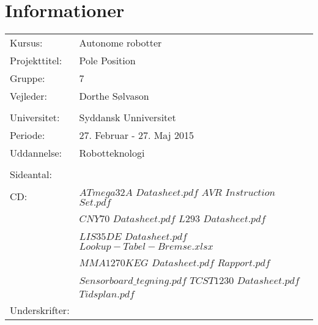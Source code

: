 \section*{Informationer}
\begin{tabularx}{\hsize}{lX}
Kursus:		    &	Autonome robotter\\
Projekttitel:	&	Pole Position\\
Gruppe:			&	7\\
Vejleder:		&	Dorthe Sølvason\\
\\
Universitet:	&	Syddansk Unniversitet\\
Periode:		&	27. Februar - 27. Maj 2015\\
Uddannelse:		&	Robotteknologi\\
\\
Sideantal:		&	\pageref{LastPage} \\
CD:				&	$ATmega32A$ $Datasheet.pdf$     \hspace{1.85cm}   $AVR$ $Instruction$ $Set.pdf$ \\
                &   $CNY70$ $Datasheet.pdf$         \hspace{2.6cm}   $L293$ $Datasheet.pdf$ \\
                &   $LIS35DE$ $Datasheet.pdf$       \hspace{2.3cm}   $Lookup-Tabel-Bremse.xlsx$ \\
                &   $MMA1270KEG$ $Datasheet.pdf$    \hspace{1.05cm}   $Rapport.pdf$ \\
                &   $Sensorboard\_tegning.pdf$      \hspace{2.1cm}   $TCST1230$ $Datasheet.pdf$ \\
                &   $Tidsplan.pdf$

\\

Underskrifter:\\
\end{tabularx}
\vspace{1.3cm}

